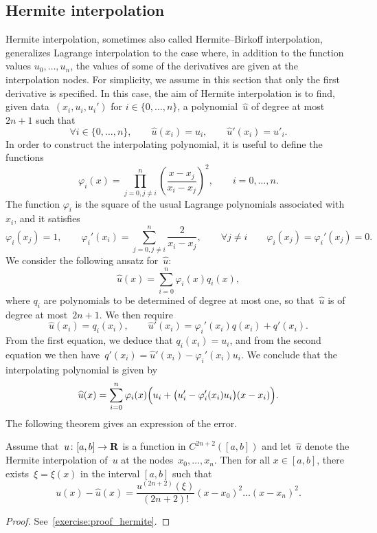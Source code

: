 \subsection{Hermite interpolation}
Hermite interpolation,
sometimes also called Hermite--Birkoff interpolation,
generalizes Lagrange interpolation to the case where,
in addition to the function values $u_0, \dotsc, u_n$,
the values of some of the derivatives are given at the interpolation nodes.
For simplicity,
we assume in this section that only the first derivative is specified.
In this case, the aim of Hermite interpolation is to find,
given data~$(x_i, u_i, u_i')$ for $i \in \{0, \dotsc, n\}$,
a polynomial~$\widehat u$ of degree at most~$2n + 1$ such that
\[
    \forall i \in \{0, \dotsc, n\}, \qquad
    \widehat u(x_i) = u_i, \qquad
    \widehat u'(x_i) = u'_i.
\]
In order to construct the interpolating polynomial,
it is useful to define the functions
\[
    \varphi_{i}(x)
    = \prod_{j=0, j\neq i}^{n} \left( \frac{x-x_j}{x_i-x_j} \right)^2,
    \qquad i = 0, \dotsc, n.
\]
The function $\varphi_i$ is the square of the usual Lagrange polynomials associated with~$x_i$,
and it satisfies
\[
    \varphi_i(x_j) = 1,
    \qquad \varphi_i'(x_i) = \sum_{j=0,j\neq i}^{n} \frac{2}{x_i - x_j},
    \qquad \forall j \neq i \qquad \varphi_i(x_j) = \varphi_i'(x_j) = 0.
\]
We consider the following ansatz for~$\widehat u$:
\[
    \widehat u(x) = \sum_{i=0}^{n} \varphi_i(x) q_i(x),
\]
where $q_i$ are polynomials to be determined of degree at most one,
so that~$\widehat u$ is of degree at most~$2n+1$.
We then require
\[
    \widehat u(x_i) = q_i(x_i), \qquad \widehat u'(x_i) = \varphi_i'(x_i) q(x_i) + q'(x_i).
\]
From the first equation, we deduce that $q_i(x_i) = u_i$,
and from the second equation we then have~$q'(x_i) = \widehat u'(x_i) - \varphi_i'(x_i) u_i$.
We conclude that the interpolating polynomial is given by
\[
    \widehat u(x) = \sum_{i=0}^{n} \varphi_i(x) \Bigl(u_i + \bigl(u_i' - \varphi_i'(x_i) u_i\bigr) (x - x_i)\Bigr).
\]
The following theorem gives an expression of the error.
\begin{theorem}
    \label{theorem:hermite_interpolation}
    Assume that~$u\colon [a, b] \to \mathbf R$ is a function in $C^{2n+2}([a, b])$ and let~$\widehat u$
    denote the Hermite interpolation of~$u$ at the nodes~$x_0, \dotsc, x_n$.
    Then for all $x \in [a, b]$,
    there exists~$\xi = \xi(x)$ in the interval $[a, b]$ such that
    \[
        u(x) - \widehat u(x) = \frac{u^{(2n+2)}(\xi)}{(2n+2)!} (x-x_0)^2 \dotsc (x - x_n)^2.
    \]
\end{theorem}
\begin{proof}
    See~\cref{exercise:proof_hermite}.
\end{proof}

